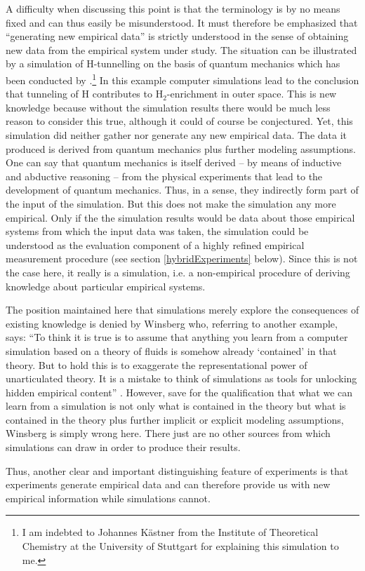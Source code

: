 \documentclass[onecollarge]{STJour}
\numberwithin{equation}{section}
\begin{document}
\begin{enumerate}
  A difficulty when discussing this point is that the terminology is by no means fixed and can thus easily be misunderstood. It must therefore be emphasized that ``generating new empirical data'' is strictly understood in the sense of obtaining new data from the empirical system under study. The situation can be illustrated by a simulation of H-tunnelling on the basis of quantum mechanics which has been conducted by \citet{goumans-kaestner:2010}.\footnote{I am indebted to Johannes Kästner from the Institute of Theoretical Chemistry at the University of Stuttgart for explaining this simulation to me.} In this example computer simulations lead to the conclusion that tunneling of H contributes to H$_2$-enrichment in outer space. This is new knowledge because without the simulation results there would be much less reason to consider this true, although it could of course be conjectured. Yet, this simulation did neither gather nor generate any new empirical data. The data it produced is derived from quantum mechanics plus further modeling assumptions. One can say that quantum mechanics is itself derived -- by means of inductive and abductive reasoning -- from the physical experiments that lead to the development of quantum mechanics. Thus, in a sense, they indirectly form part of the input of the simulation. But this does not make the simulation any more empirical. Only if the the simulation results  would be data about those empirical systems from which the input data was taken, the  simulation could be understood as the evaluation component of a highly refined empirical measurement procedure (see section \ref{hybridExperiments} below). Since this is not the case here, it really is a simulation, i.e. a non-empirical procedure of deriving knowledge about particular empirical systems.
  
  The position maintained here that simulations merely explore the consequences of existing knowledge is denied by Winsberg who, referring to another example, says: ``To think it is true is to assume that anything you learn from a computer simulation based on a theory of fluids is somehow already `contained' in that theory. But to hold this is to exaggerate the representational power of unarticulated theory. It is a mistake to think of simulations as tools for unlocking hidden empirical content'' \cite[p. 54]{winsberg:2010}. However, save for the qualification that what we can learn from a simulation is not only what is contained in the theory but what is contained in the theory plus further implicit or explicit modeling assumptions, Winsberg is simply wrong here. There just are no other sources from which simulations can draw in order to produce their results.

  Thus, another clear and important distinguishing feature of
  experiments is that experiments generate empirical data and can therefore provide us with new empirical information while simulations cannot.
\end{enumerate}
\end{document}
